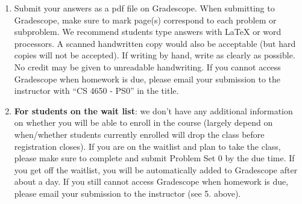 \documentclass[11pt, letterpaper]{article}
\begin{document}
\begin{enumerate}
 
    \item Submit your answers as a pdf file on Gradescope. When submitting to Gradescope, make sure to mark page(s) correspond to each problem or subproblem. We recommend students type answers with LaTeX or word processors. A scanned handwritten copy would also be acceptable (but hard copies will not be accepted). If writing by hand, write as clearly as possible. No credit may be given to unreadable handwriting. If you cannot access Gradescope when homework is due, please email your submission to the instructor with ``CS 4650 - PS0'' in the title. 
    
    \item \textbf{For students on the wait list}: we don't have any additional information on whether you will be able to enroll in the course (largely depend on when/whether students currently enrolled will drop the class before registration closes). If you are on the waitlist and plan to take the class, please make sure to complete and submit Problem Set 0 by the due time. If you get off the waitlist, you will be automatically added to Gradescope after about a day. If you still cannot access Gradescope when homework is due, please email your submission to the instructor (see 5. above).
\end{enumerate}

\newpage
\end{document}
